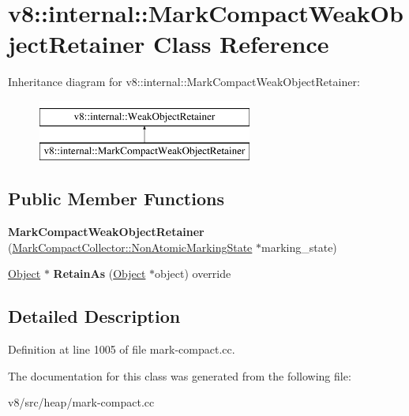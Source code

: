 \hypertarget{classv8_1_1internal_1_1MarkCompactWeakObjectRetainer}{}\section{v8\+:\+:internal\+:\+:Mark\+Compact\+Weak\+Object\+Retainer Class Reference}
\label{classv8_1_1internal_1_1MarkCompactWeakObjectRetainer}
Inheritance diagram for v8\+:\+:internal\+:\+:Mark\+Compact\+Weak\+Object\+Retainer\+:\begin{figure}[H]
\begin{center}
\leavevmode
\includegraphics[height=2.000000cm]{classv8_1_1internal_1_1MarkCompactWeakObjectRetainer}
\end{center}
\end{figure}
\subsection*{Public Member Functions}
\begin{DoxyCompactItemize}
\item 
\mbox{\label{classv8_1_1internal_1_1MarkCompactWeakObjectRetainer_a4a0049d280085977f469f336e0e809c3}} 
{\bfseries Mark\+Compact\+Weak\+Object\+Retainer} (\mbox{\hyperlink{classv8_1_1internal_1_1MajorNonAtomicMarkingState}{Mark\+Compact\+Collector\+::\+Non\+Atomic\+Marking\+State}} $\ast$marking\+\_\+state)
\item 
\mbox{\label{classv8_1_1internal_1_1MarkCompactWeakObjectRetainer_a6e08b04cce5e9507fa47475c2a9b4fca}} 
\mbox{\hyperlink{classv8_1_1internal_1_1Object}{Object}} $\ast$ {\bfseries Retain\+As} (\mbox{\hyperlink{classv8_1_1internal_1_1Object}{Object}} $\ast$object) override
\end{DoxyCompactItemize}


\subsection{Detailed Description}


Definition at line 1005 of file mark-\/compact.\+cc.



The documentation for this class was generated from the following file\+:\begin{DoxyCompactItemize}
\item 
v8/src/heap/mark-\/compact.\+cc\end{DoxyCompactItemize}
